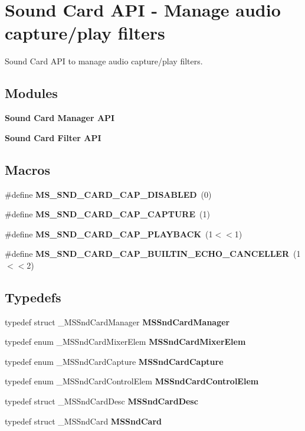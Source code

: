 \section{Sound Card A\-P\-I -\/ Manage audio capture/play filters}
\label{group__mediastreamer2__soundcard}


Sound Card A\-P\-I to manage audio capture/play filters.  


\subsection*{Modules}
\begin{DoxyCompactItemize}
\item 
{\bf Sound Card Manager A\-P\-I}
\item 
{\bf Sound Card Filter A\-P\-I}
\end{DoxyCompactItemize}
\subsection*{Macros}
\begin{DoxyCompactItemize}
\item 
\#define {\bf M\-S\-\_\-\-S\-N\-D\-\_\-\-C\-A\-R\-D\-\_\-\-C\-A\-P\-\_\-\-D\-I\-S\-A\-B\-L\-E\-D}~(0)
\item 
\#define {\bf M\-S\-\_\-\-S\-N\-D\-\_\-\-C\-A\-R\-D\-\_\-\-C\-A\-P\-\_\-\-C\-A\-P\-T\-U\-R\-E}~(1)
\item 
\#define {\bf M\-S\-\_\-\-S\-N\-D\-\_\-\-C\-A\-R\-D\-\_\-\-C\-A\-P\-\_\-\-P\-L\-A\-Y\-B\-A\-C\-K}~(1$<$$<$1)
\item 
\#define {\bf M\-S\-\_\-\-S\-N\-D\-\_\-\-C\-A\-R\-D\-\_\-\-C\-A\-P\-\_\-\-B\-U\-I\-L\-T\-I\-N\-\_\-\-E\-C\-H\-O\-\_\-\-C\-A\-N\-C\-E\-L\-L\-E\-R}~(1$<$$<$2)
\end{DoxyCompactItemize}
\subsection*{Typedefs}
\begin{DoxyCompactItemize}
\item 
typedef struct \-\_\-\-M\-S\-Snd\-Card\-Manager {\bf M\-S\-Snd\-Card\-Manager}
\item 
typedef enum \-\_\-\-M\-S\-Snd\-Card\-Mixer\-Elem {\bf M\-S\-Snd\-Card\-Mixer\-Elem}
\item 
typedef enum \-\_\-\-M\-S\-Snd\-Card\-Capture {\bf M\-S\-Snd\-Card\-Capture}
\item 
typedef enum \-\_\-\-M\-S\-Snd\-Card\-Control\-Elem {\bf M\-S\-Snd\-Card\-Control\-Elem}
\item 
typedef struct \-\_\-\-M\-S\-Snd\-Card\-Desc {\bf M\-S\-Snd\-Card\-Desc}
\item 
typedef struct \-\_\-\-M\-S\-Snd\-Card {\bf M\-S\-Snd\-Card}
\end{DoxyCompactItemize}



